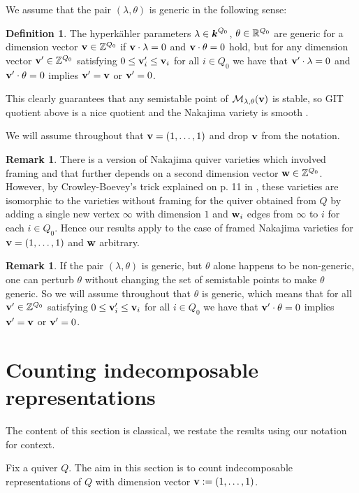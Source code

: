 \documentclass{amsart}
\theoremstyle{definition}
\newtheorem{defn}[thm]{Definition}
\newtheorem{rem}[thm]{Remark}
\begin{document}
We assume that the pair $(\lambda,\theta)$ is generic in the following sense:
\begin{defn}\label{def:generic}
The hyperk\"ahler parameters $\lambda\in{\boldsymbol{k}}^{Q_0}$, $\theta\in\mathbb{R}^{Q_0}$ are generic for a dimension vector $\mathbf{v}\in \mathbb{Z}^{Q_0}$ if $\mathbf{v}\cdot \lambda=0$ and $\mathbf{v}\cdot\theta=0$ hold, but for any dimension vector $\mathbf{v}'\in \mathbb{Z}^{Q_0}$ satisfying $0\leq \mathbf{v}'_i \leq \mathbf{v}_i$ for all $i\in Q_0$ we have that $\mathbf{v}'\cdot \lambda=0$ and $\mathbf{v}'\cdot\theta=0$ implies $\mathbf{v}'=\mathbf{v}$ or $\mathbf{v}'=0$.
\end{defn}
This clearly guarantees that any semistable point of $\mathcal{M}_{\lambda, \theta}(\mathbf{v})$ is stable, so GIT quotient above is a nice quotient and the Nakajima variety is smooth .

We will assume throughout that $\mathbf{v}=(1,\ldots,1)$ and drop $\mathbf{v}$ from the notation.

\begin{rem}
There is a version of Nakajima quiver varieties which involved framing and that further depends on a second dimension vector $\mathbf{w}\in\mathbb{Z}^{Q_0}$. However, by Crowley-Boevey's trick explained on p. 11 in \cite{Ginzburg}, these varieties are isomorphic to the varieties without framing for the quiver obtained from $Q$ by adding a single new vertex $\infty$ with dimension $1$ and $\mathbf{w}_i$ edges from $\infty$ to $i$ for each $i\in Q_0$. Hence our results apply to the case of framed Nakajima varieties for $\mathbf{v}=(1,\ldots,1)$ and $\mathbf{w}$ arbitrary.
\end{rem}

\begin{rem}
If the pair $(\lambda,\theta)$ is generic, but $\theta$ alone happens to be non-generic, one can perturb $\theta$ without changing the set of semistable points to make $\theta$ generic. So we will assume throughout that $\theta$ is generic, which means that for all $\mathbf{v}'\in \mathbb{Z}^{Q_0}$ satisfying $0\leq \mathbf{v}'_i \leq \mathbf{v}_i$ for all $i\in Q_0$ we have that $\mathbf{v}'\cdot\theta=0$ implies $\mathbf{v}'=\mathbf{v}$ or $\mathbf{v}'=0$.
\end{rem}

\section{Counting indecomposable representations}\label{sc:indecomp}
The content of this section is classical, we restate the results using our notation for context.

Fix a quiver $Q$.
The aim in this section is to count indecomposable representations of $Q$ with dimension vector $\mathbf{v}:= (1,\ldots,1)$.
\end{document}
